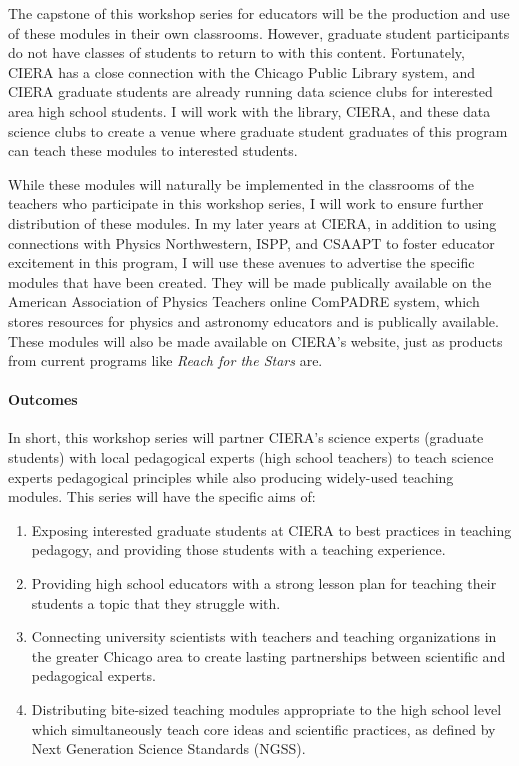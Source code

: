 \documentclass[11pt, preprint]{aastex}
\begin{document}
The capstone of this workshop series for educators will be the production and use of these modules in their own classrooms.
However, graduate student participants do not have classes of students to return to with this content.
Fortunately, CIERA has a close connection with the Chicago Public Library system, and CIERA graduate students are already running data science clubs for interested area high school students.
I will work with the library, CIERA, and these data science clubs to create a venue where graduate student graduates of this program can teach these modules to interested students.

While these modules will naturally be implemented in the classrooms of the teachers who participate in this workshop series, I will work to ensure further distribution of these modules.
In my later years at CIERA, in addition to using connections with Physics Northwestern, ISPP, and CSAAPT to foster educator excitement in this program, I will use these avenues to advertise the specific modules that have been created.
They will be made publically available on the American Association of Physics Teachers online ComPADRE system, which stores resources for physics and astronomy educators and is publically available.
These modules will also be made available on CIERA's website, just as products from current programs like \emph{Reach for the Stars} are.



\vspace{-0.5cm}
\paragraph{Outcomes}
In short, this workshop series will partner CIERA's science experts (graduate students) with local pedagogical experts (high school teachers) to teach science experts pedagogical principles while also producing widely-used teaching modules.
This series will have the specific aims of:
\vspace{-0.6cm}
\begin{enumerate}
\item Exposing interested graduate students at CIERA to best practices in teaching pedagogy, and providing those students with a teaching experience.
\vspace{-0.4cm}
\item Providing high school educators with a strong lesson plan for teaching their students a topic that they struggle with.
\vspace{-0.4cm}
\item Connecting university scientists with teachers and teaching organizations in the greater Chicago area to create lasting partnerships between scientific and pedagogical experts.
\vspace{-0.4cm}
\item Distributing bite-sized teaching modules appropriate to the high school level which simultaneously teach core ideas and scientific practices, as defined by Next Generation Science Standards (NGSS).
\vspace{-0.4cm}
\end{enumerate}
\end{document}
